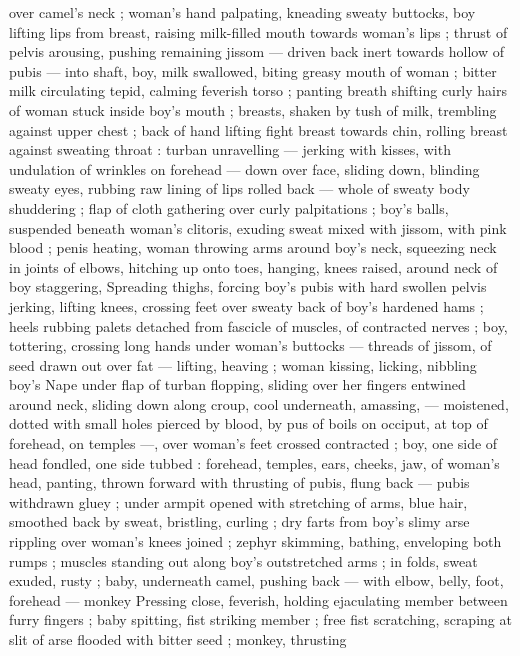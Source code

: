 over camel's neck ; woman's hand palpating, kneading sweaty
buttocks, boy lifting lips from breast, raising milk-filled mouth
towards woman's lips ; thrust of pelvis arousing, pushing remaining
jissom --- driven back inert towards hollow of pubis --- into shaft,
boy, milk swallowed, biting greasy mouth of woman ; bitter milk
circulating tepid, calming feverish torso ; panting breath shifting
curly hairs of woman stuck inside boy's mouth ; breasts, shaken by
tush of milk, trembling against upper chest ; back of hand lifting
fight breast towards chin, rolling breast against sweating throat :
turban unravelling --- jerking with kisses, with undulation of wrinkles
on forehead --- down over face, sliding down, blinding sweaty eyes,
rubbing raw lining of lips rolled back --- whole of sweaty body
shuddering ; flap of cloth gathering over curly palpitations ; boy's
balls, suspended beneath woman's clitoris, exuding sweat mixed with
jissom, with pink blood ; penis heating, woman throwing arms around
boy's neck, squeezing neck in joints of elbows, hitching up onto
toes, hanging, knees raised, around neck of boy staggering,
Spreading thighs, forcing boy's pubis with hard swollen pelvis
jerking, lifting knees, crossing feet over sweaty back of boy's
hardened hams ; heels rubbing palets detached from fascicle of
muscles, of contracted nerves ; boy, tottering, crossing long hands
under woman's buttocks --- threads of jissom, of seed drawn out
over fat --- lifting, heaving ; woman kissing, licking, nibbling boy's
Nape under flap of turban flopping, sliding over her fingers entwined
around neck, sliding down along croup, cool underneath, amassing,
--- moistened, dotted with small holes pierced by blood, by pus of
boils on occiput, at top of forehead, on temples ---, over woman's
feet crossed contracted ; boy, one side of head fondled, one side
tubbed : forehead, temples, ears, cheeks, jaw, of woman's head,
panting, thrown forward with thrusting of pubis, flung back --- pubis
withdrawn gluey ; under armpit opened with stretching of arms, blue
hair, smoothed back by sweat, bristling, curling ; dry farts from boy's
slimy arse rippling over woman's knees joined ; zephyr skimming,
bathing, enveloping both rumps ; muscles standing out along boy's
outstretched arms ; in folds, sweat exuded, rusty ; baby, underneath
camel, pushing back --- with elbow, belly, foot, forehead --- monkey
Pressing close, feverish, holding ejaculating member between furry
fingers ; baby spitting, fist striking member ; free fist scratching,
scraping at slit of arse flooded with bitter seed ; monkey, thrusting
